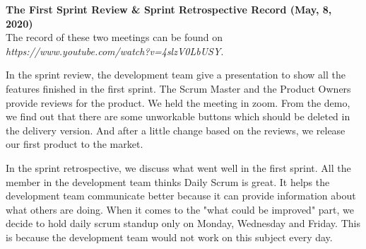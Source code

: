 \documentclass{report}
\begin{document}
\textbf{The First Sprint Review \& Sprint Retrospective Record (May, 8, 2020)}
\\
The record of these two meetings can be found on \textit{https://www.youtube.com/watch?v=4slzV0LbUSY}.

In the sprint review, the development team give a presentation to show all the features finished in the first sprint. The Scrum Master and the Product Owners provide reviews for the product. We held the meeting in zoom. From the demo, we find out that there are some unworkable buttons which should be deleted in the delivery version. And after a little change based on the reviews, we release our first product to the market.

In the sprint retrospective, we discuss what went well in the first sprint. All the member in the development team thinks Daily Scrum is great. It helps the development team communicate better because it can provide information about what others are doing. When it comes to the "what could be improved" part, we decide to hold daily scrum standup only on Monday, Wednesday and Friday. This is because the development team would not work on this subject every day.
\end{document}
